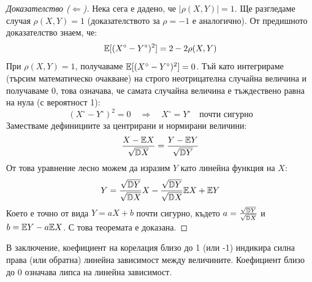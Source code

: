 \begin{proof}[Доказателство ($\Longleftarrow$)]
Нека сега е дадено, че $|\rho(X, Y)| = 1$. Ще разгледаме случая $\rho(X, Y) = 1$ (доказателството за $\rho = -1$ е аналогично).
От предишното доказателство знаем, че:
\[
\mathbb{E}[(X^\circ - Y^\circ)^2] = 2 - 2\rho(X, Y)
\]
При $\rho(X, Y) = 1$, получаваме $\mathbb{E}[(X^\circ - Y^\circ)^2] = 0$.
Тъй като интегрираме (търсим математическо очакване) на строго неотрицателна случайна величина и получаваме 0, това означава, че самата случайна величина е тъждествено равна на нула (с вероятност 1):
\[
(X^\circ - Y^\circ)^2 = 0 \quad\Longrightarrow\quad X^\circ = Y^\circ\quad\text{почти сигурно}
\]
Заместваме дефинициите за центрирани и нормирани величини:
\[
\frac{X - \mathbb{E} X}{\sqrt{\mathbb{D} X}} = \frac{Y - \mathbb{E} Y}{\sqrt{\mathbb{D} Y}}
\]
От това уравнение лесно можем да изразим $Y$ като линейна функция на $X$:
\[
Y = \frac{\sqrt{\mathbb{D} Y}}{\sqrt{\mathbb{D} X}} X - \frac{\sqrt{\mathbb{D} Y}}{\sqrt{\mathbb{D} X}} \mathbb{E} X + \mathbb{E} Y
\]
Което е точно от вида $Y = aX + b$ почти сигурно, където
$a = \frac{\sqrt{\mathbb{D} Y}}{\sqrt{\mathbb{D} X}}$ и $b = \mathbb{E} Y - a\mathbb{E} X$. С това теоремата е доказана.
\end{proof}

В заключение, коефициент на корелация близо до 1 (или -1) индикира силна права (или обратна) линейна зависимост между величините. Коефициент близо до 0 означава липса на линейна зависимост.

